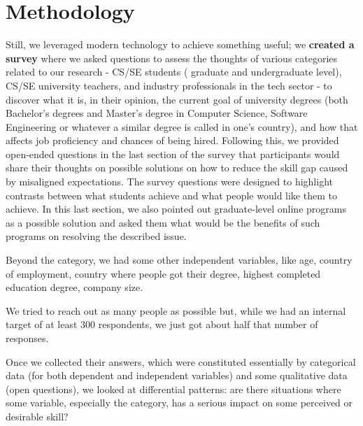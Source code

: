 \documentclass{sigchi}
\begin{document}
\section{Methodology}
Still, we leveraged modern technology to achieve something useful; we \textbf{created a survey} where we asked questions to assess the thoughts of various categories related to our research - CS/SE students ( graduate and undergraduate level), CS/SE university teachers, and industry professionals in the tech sector - to discover what it is, in their opinion, the current goal of university degrees (both Bachelor's degrees and Master's degree in Computer Science, Software Engineering or whatever a similar degree is called in one's country), and how that affects job proficiency and chances of being hired. Following this, we provided open-ended questions in the last section of the survey that participants would share their thoughts on possible solutions on how to reduce the skill gap caused by misaligned expectations. The survey questions were designed to highlight contrasts between what students achieve and what people would like them to achieve. In this last section, we also pointed out graduate-level online programs as a possible solution and asked them what would be the benefits of such programs on resolving the described issue.

Beyond the category, we had some other independent variables, like age, country of employment, country where people got their degree, highest completed education degree, company size.

We tried to reach out as many people as possible but, while we had an internal target of at least 300 respondents, we just got about half that number of responses. 

Once we collected their answers, which were constituted essentially by categorical data (for both dependent and independent variables) and some qualitative data (open questions), we looked at differential patterns: are there situations where some variable, especially the category, has a serious impact on some perceived or desirable skill?
 
\end{document}

